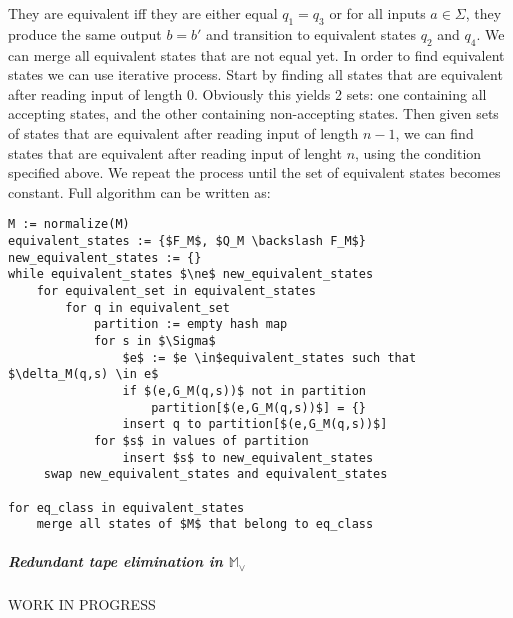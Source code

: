 \documentclass[12pt]{article}
\begin{document}
They are equivalent iff they are either equal $q_1=q_3$ or for all inputs $a\in\Sigma$, they produce the same output $b=b'$ and transition  to equivalent states $q_2$ and $q_4$. We can merge all equivalent states that are not equal yet. In order to find equivalent states we can use iterative process. 
Start by finding all states that are equivalent after reading input of length 0. Obviously this yields 2 sets: one containing all accepting states, and the other containing non-accepting states. Then given sets of states that are equivalent after reading input of length $n-1$, we can find states that are equivalent after reading input of lenght $n$, using the condition specified above. We repeat the process until the set of equivalent states becomes constant.
Full algorithm can be written as:
\begin{lstlisting}
M := normalize(M)
equivalent_states := {$F_M$, $Q_M \backslash F_M$}
new_equivalent_states := {} 
while equivalent_states $\ne$ new_equivalent_states
    for equivalent_set in equivalent_states
        for q in equivalent_set
            partition := empty hash map 
            for s in $\Sigma$
                $e$ := $e \in$equivalent_states such that $\delta_M(q,s) \in e$
                if $(e,G_M(q,s))$ not in partition 
                    partition[$(e,G_M(q,s))$] = {}
                insert q to partition[$(e,G_M(q,s))$]
            for $s$ in values of partition
                insert $s$ to new_equivalent_states
     swap new_equivalent_states and equivalent_states 

for eq_class in equivalent_states
    merge all states of $M$ that belong to eq_class
\end{lstlisting}


\subparagraph{Redundant tape elimination in $\mathbb{M}_\vee$} 
WORK IN PROGRESS
\end{document}
